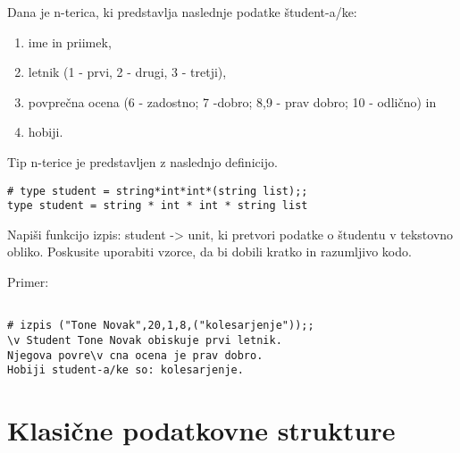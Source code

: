 \begin{ex}
Dana je n-terica, ki predstavlja naslednje podatke \v student-a/ke:
\begin{enumerate}
\item ime in priimek,
\item letnik (1 - prvi, 2 - drugi, 3 - tretji),
\item povpre\v cna ocena (6 - zadostno; 7 -dobro; 8,9 - prav dobro; 10 - odli\v cno) in
\item hobiji.
\end{enumerate}

Tip n-terice je predstavljen z naslednjo definicijo.

\begin{verbatim}
# type student = string*int*int*(string list);;
type student = string * int * int * string list
\end{verbatim}

Napi\v si funkcijo izpis: student -> unit, ki pretvori podatke o \v studentu v tekstovno obliko. Poskusite uporabiti vzorce, da bi dobili kratko in razumljivo kodo.

Primer: \begin{verbatim}

# izpis ("Tone Novak",20,1,8,("kolesarjenje"));; 
\v Student Tone Novak obiskuje prvi letnik. 
Njegova povre\v cna ocena je prav dobro.
Hobiji student-a/ke so: kolesarjenje.
\end{verbatim}
\end{ex}

\section{Klasi\v cne podatkovne strukture}


